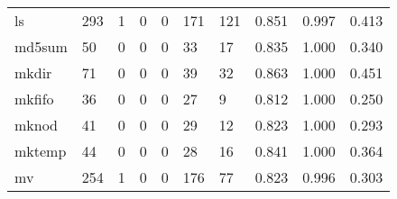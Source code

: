 \begin{longtable}{lp{1.3cm}p{1.3cm}p{1.3cm}p{1.3cm}p{1.3cm}p{1.3cm}p{1.3cm}p{1.3cm}p{1.3cm}}
ls        &                    293 &                                             1 &                                            0 &                                           0 &                                          171 &                                        121 &                                0.851 &                                  0.997 &                                0.413 \\
md5sum    &                     50 &                                             0 &                                            0 &                                           0 &                                           33 &                                         17 &                                0.835 &                                  1.000 &                                0.340 \\
mkdir     &                     71 &                                             0 &                                            0 &                                           0 &                                           39 &                                         32 &                                0.863 &                                  1.000 &                                0.451 \\
mkfifo    &                     36 &                                             0 &                                            0 &                                           0 &                                           27 &                                          9 &                                0.812 &                                  1.000 &                                0.250 \\
mknod     &                     41 &                                             0 &                                            0 &                                           0 &                                           29 &                                         12 &                                0.823 &                                  1.000 &                                0.293 \\
mktemp    &                     44 &                                             0 &                                            0 &                                           0 &                                           28 &                                         16 &                                0.841 &                                  1.000 &                                0.364 \\
mv        &                    254 &                                             1 &                                            0 &                                           0 &                                          176 &                                         77 &                                0.823 &                                  0.996 &                                0.303 \\

\end{longtable}
